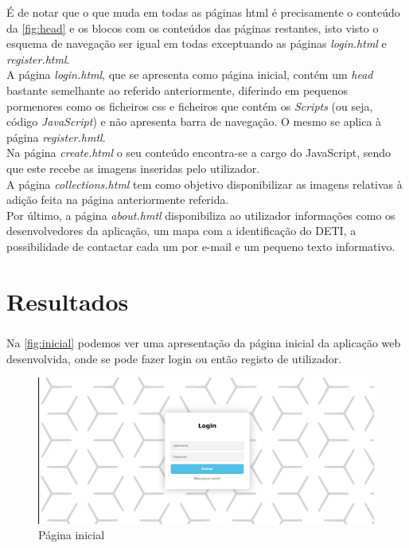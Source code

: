 \documentclass[a4paper, 11pt, oneside]{report}
\begin{document}
\indent É de notar que o que muda em todas as páginas \acs{html} é precisamente o conteúdo da \autoref{fig:head} e os blocos com os conteúdos das páginas restantes, isto visto o esquema de navegação ser igual em todas exceptuando as páginas \textit{login.html} e \textit{register.html}.\\
\indent A página \textit{login.html}, que se apresenta como página inicial, contém um \textit{head} bastante semelhante ao referido anteriormente, diferindo em pequenos pormenores como os ficheiros \acs{css} e ficheiros que contém os \textit{Scripts} (ou seja, código \textit{JavaScript}) e não apresenta barra de navegação. O mesmo se aplica à página \textit{register.hmtl}.\\
\indent Na página \textit{create.html} o seu conteúdo encontra-se a cargo do JavaScript, sendo que este recebe as imagens inseridas pelo utilizador.\\
\indent A página \textit{collections.html} tem como objetivo disponibilizar as imagens relativas à adição feita na página anteriormente referida.\\
\indent Por último, a página \textit{about.hmtl} disponibiliza ao utilizador informações como os desenvolvedores da aplicação, um mapa com a identificação do DETI, a possibilidade de contactar cada um por e-mail e um pequeno texto informativo.

\clearpage

\chapter{Resultados}

\paragraph{} Na \autoref{fig:inicial} podemos ver uma apresentação da página inicial da aplicação web desenvolvida, onde se pode fazer login ou então registo de utilizador.

\begin{figure}[h]
\center
\includegraphics[width=320pt]{inicioPAGE.png}
\caption{Página inicial}
\label{fig:inicial}
\end{figure}
\end{document}
